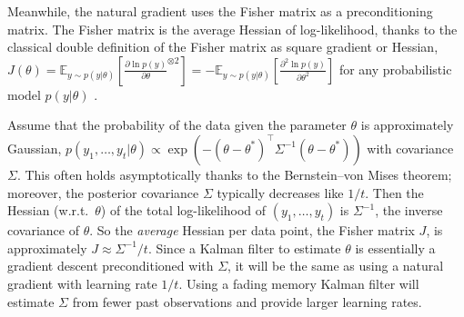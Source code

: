 \documentclass[11pt,a4paper]{article}
\newcommand{\E}{\mathbb{E}}
\newcommand{\1}{\mathbbm{1}}
\theoremstyle{yannthm}
\theoremstyle{yannthm2}
\newcommand{\transp}[1]{#1^{\!\top}\!}
\numberwithin{equation}{section}
\begin{document}
Meanwhile, the natural gradient uses the Fisher matrix as a
preconditioning matrix. The Fisher matrix is the average Hessian
of log-likelihood, thanks to the classical double definition of the
Fisher matrix as square gradient or Hessian,
$J(\theta)=\E_{y\sim p(y|\theta)} \left[\frac{\partial \ln p(y)}{\partial \theta}^{\otimes
2}\right]=-\E_{y\sim p(y|\theta)} \left[\frac{\partial^2 \ln p(y)}{\partial
\theta^2}\right]$ for any probabilistic model $p(y|\theta)$
\cite{Kullback}.

Assume that the probability of the data given the parameter $\theta$ is
approximately Gaussian,
$p(y_1,\ldots,y_t|\theta)\propto\exp(-\transp{(\theta-\theta^\ast)}\Sigma^{-1}(\theta-\theta^\ast))$
with covariance $\Sigma$. This often holds asymptotically thanks to the
Bernstein--von Mises theorem; moreover, the posterior covariance $\Sigma$
typically decreases like $1/t$. Then the Hessian (w.r.t.\ $\theta$) of the total
log-likelihood of $(y_1,\ldots,y_t)$ is $\Sigma^{-1}$, the inverse
covariance of $\theta$. So the \emph{average} Hessian per data point, the
Fisher matrix $J$,
is approximately $J\approx \Sigma^{-1}/t$. Since a Kalman filter to estimate
$\theta$ is essentially a gradient descent preconditioned with
$\Sigma$, it will be the same as using a natural gradient with learning
rate $1/t$. Using a fading memory Kalman filter will estimate $\Sigma$
from fewer past observations and provide larger learning rates.

% 
\end{document}
